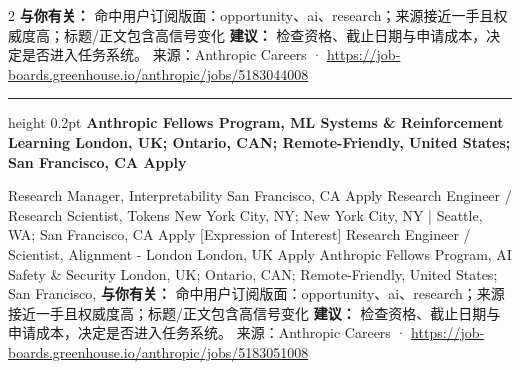 \documentclass[10.5pt]{ctexart}
\begin{document}
\begin{multicols}{2}
\textbf{与你有关：} 命中用户订阅版面：opportunity、ai、research；来源接近一手且权威度高；标题/正文包含高信号变化
\textbf{建议：} 检查资格、截止日期与申请成本，决定是否进入任务系统。
{\footnotesize\color{ormuted} 来源：Anthropic Careers · \url{https://job-boards.greenhouse.io/anthropic/jobs/5183044008}}
\vspace{2mm}
\hrule height 0.2pt
\vspace{2mm}
{\large\bfseries Anthropic Fellows Program, ML Systems \& Reinforcement Learning London, UK; Ontario, CAN; Remote-Friendly, United States; San Francisco, CA Apply}\par
[Expression of Interest] Research Manager, Interpretability San Francisco, CA Apply Research Engineer / Research Scientist, Tokens New York City, NY; New York City, NY | Seattle, WA; San Francisco, CA Apply [Expression of Interest] Research Engineer / Scientist, Alignment - London London, UK Apply Anthropic Fellows Program, AI Safety \& Security London, UK; Ontario, CAN; Remote-Friendly, United States; San Francisco, 
\textbf{与你有关：} 命中用户订阅版面：opportunity、ai、research；来源接近一手且权威度高；标题/正文包含高信号变化
\textbf{建议：} 检查资格、截止日期与申请成本，决定是否进入任务系统。
{\footnotesize\color{ormuted} 来源：Anthropic Careers · \url{https://job-boards.greenhouse.io/anthropic/jobs/5183051008}}
\end{multicols}
\end{document}

